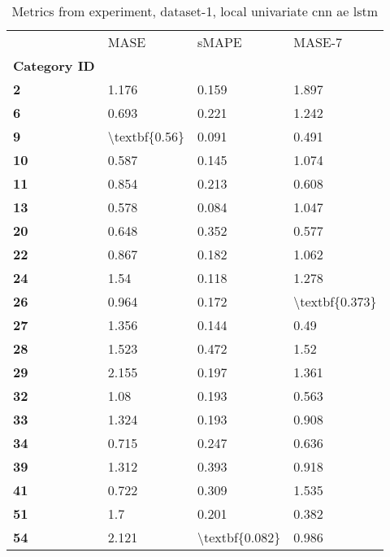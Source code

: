 \begin{table}[h]
\centering
\caption{Metrics from experiment, dataset-1, local univariate cnn ae lstm}
\label{table:local-univariate-cnn-ae-lstm-dataset-1}
\begin{tabular}{llll}
\toprule
{} &           MASE &           sMAPE &          MASE-7 \\
\textbf{Category ID} &                &                 &                 \\
\midrule
\textbf{2          } &          1.176 &           0.159 &           1.897 \\
\textbf{6          } &          0.693 &           0.221 &           1.242 \\
\textbf{9          } &  \textbackslash textbf\{0.56\} &           0.091 &           0.491 \\
\textbf{10         } &          0.587 &           0.145 &           1.074 \\
\textbf{11         } &          0.854 &           0.213 &           0.608 \\
\textbf{13         } &          0.578 &           0.084 &           1.047 \\
\textbf{20         } &          0.648 &           0.352 &           0.577 \\
\textbf{22         } &          0.867 &           0.182 &           1.062 \\
\textbf{24         } &           1.54 &           0.118 &           1.278 \\
\textbf{26         } &          0.964 &           0.172 &  \textbackslash textbf\{0.373\} \\
\textbf{27         } &          1.356 &           0.144 &            0.49 \\
\textbf{28         } &          1.523 &           0.472 &            1.52 \\
\textbf{29         } &          2.155 &           0.197 &           1.361 \\
\textbf{32         } &           1.08 &           0.193 &           0.563 \\
\textbf{33         } &          1.324 &           0.193 &           0.908 \\
\textbf{34         } &          0.715 &           0.247 &           0.636 \\
\textbf{39         } &          1.312 &           0.393 &           0.918 \\
\textbf{41         } &          0.722 &           0.309 &           1.535 \\
\textbf{51         } &            1.7 &           0.201 &           0.382 \\
\textbf{54         } &          2.121 &  \textbackslash textbf\{0.082\} &           0.986 \\
\bottomrule
\end{tabular}
\end{table}

